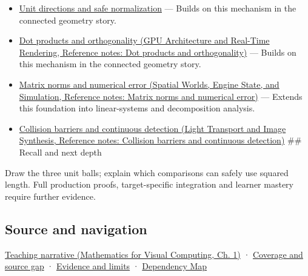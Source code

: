 \begin{itemize}
\item
  \hyperref[appendix-f744e41b95b4]{Unit directions and safe normalization} --- Builds on this mechanism in the connected geometry story.
\item
  \href{../06-GPU-Architecture-and-Real-Time-Rendering/main.pdf\#nameddest=appendix-8bc4e8fc547c}{Dot products and orthogonality (GPU Architecture and Real-Time Rendering, Reference notes: Dot products and orthogonality)} --- Builds on this mechanism in the connected geometry story.
\item
  \href{../05-Spatial-Worlds-Engine-State-and-Simulation/main.pdf\#nameddest=appendix-f8657bac66e5}{Matrix norms and numerical error (Spatial Worlds, Engine State, and Simulation, Reference notes: Matrix norms and numerical error)} --- Extends this foundation into linear-systems and decomposition analysis.
\item
  \href{../04-Light-Transport-and-Image-Synthesis/main.pdf\#nameddest=appendix-a9ba01fa72a6}{Collision barriers and continuous detection (Light Transport and Image Synthesis, Reference notes: Collision barriers and continuous detection)} \#\# Recall and next depth
\end{itemize}

Draw the three unit balls; explain which comparisons can safely use squared length. Full production proofs, target-specific integration and learner mastery require further evidence.

\subsection{Source and navigation}\label{appendix-49933872bb51-source-and-navigation}

\href{../02-Mathematics-for-Visual-Computing/main.pdf\#nameddest=01-foundations-i-ch017-a-ruler-needs-more-than-coordinate-components}{Teaching narrative (Mathematics for Visual Computing, Ch. 1)} · \hyperref[appendix-fd090d982a15-phase-6---parts-501-600]{Coverage and source gap} · \hyperref[appendix-a103e7846d21-phase-6---source-analysis-and-verification]{Evidence and limits} · \hyperref[appendix-4ad47bdd269a]{Dependency Map}
